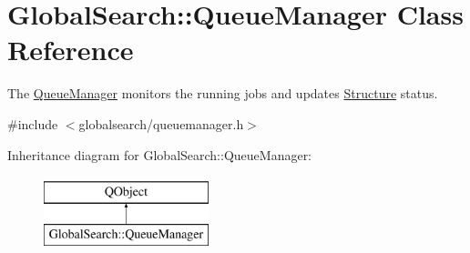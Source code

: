 \hypertarget{classGlobalSearch_1_1QueueManager}{\section{Global\-Search\-:\-:Queue\-Manager Class Reference}
\label{classGlobalSearch_1_1QueueManager}
}


The \hyperlink{classGlobalSearch_1_1QueueManager}{Queue\-Manager} monitors the running jobs and updates \hyperlink{classGlobalSearch_1_1Structure}{Structure} status.  




{\ttfamily \#include $<$globalsearch/queuemanager.\-h$>$}

Inheritance diagram for Global\-Search\-:\-:Queue\-Manager\-:\begin{figure}[H]
\begin{center}
\leavevmode
\includegraphics[height=2.000000cm]{classGlobalSearch_1_1QueueManager}
\end{center}
\end{figure}
